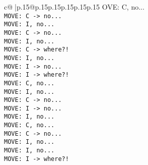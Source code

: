 \documentclass{article}
\begin{document}
{\begin{supertabular}{c@{$\;$}|p{.15\linewidth}@{}p{.15\linewidth}p{.15\linewidth}p{.15\linewidth}p{.15\linewidth}p{.15\linewidth}}
{{{OVE: C, no...\\ \tt  MOVE: C -> no...\\ \tt  MOVE: I, no...\\ \tt  MOVE: C -> no...\\ \tt  MOVE: I, no...\\ \tt  MOVE: C -> where?!\\ \tt  MOVE: I, no...\\ \tt  MOVE: I -> no...\\ \tt  MOVE: I -> where?!\\ \tt  MOVE: C, no...\\ \tt  MOVE: I, no...\\ \tt  MOVE: C -> no...\\ \tt  MOVE: I -> no...\\ \tt  MOVE: I, no...\\ \tt  MOVE: C, no...\\ \tt  MOVE: C -> no...\\ \tt  MOVE: I, no...\\ \tt  MOVE: I, no...\\ \tt  MOVE: I -> where?!\\ \tt  }}}
\end{supertabular}}
\end{document}
